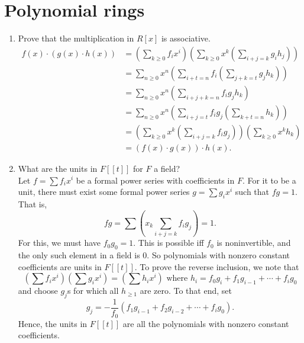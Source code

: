 \documentclass[13pt]{article}
\begin{document}
\section{Polynomial rings}
\begin{enumerate}
\item Prove that the multiplication in $R[x]$ is associative.\\
\begin{align*}
f(x)\cdot(g(x)\cdot h(x)) &= 
             \left(\sum_{k\geq 0}f_ix^i\right)\left(\sum_{k\geq 0}x^k\left(\sum_{i+j=k}g_ih_j\right)\right)\\
          &= \sum_{n\geq 0}x^n\left(\sum_{i+t=n}f_i\left(\sum_{j+k=t}g_jh_k\right)\right)\\
          &= \sum_{n\geq 0}x^n\left(\sum_{i+j+k=n}f_ig_jh_k\right)\\
          &= \sum_{n\geq 0}x^n\left(\sum_{i+j=t}f_ig_j\left(\sum_{k+t=n}h_k\right)\right)\\
          &= \left(\sum_{k\geq 0}x^k\left(\sum_{i+j=k}f_ig_j\right)\right)\left(\sum_{k\geq 0}x^kh_k\right)\\
          &= (f(x)\cdot g(x))\cdot h(x).
\end{align*}
\item What are the units in $F[[t]]$ for $F$ a field?\\
Let $f = \sum f_ix^i$ be a formal power series with coefficients in $F$. For it
to be a unit, there must exist some formal power series $g = \sum g_ix^i$ such
that $fg = 1$. That is, \[fg = \sum (x_k \sum_{i+j=k}f_ig_j) = 1.\] 
For this, we must have $f_0g_0=1$. This is possible iff $f_0$ is noninvertible,
and the only such element in a field is $0$. So polynomials with nonzero
constant coefficients are units in $F[[t]]$. 
To prove the reverse inclusion, we note that 
\[(\sum f_ix^i)(\sum g_i x^i) = (\sum h_ix^i)\text{ where } h_i = f_0g_i+f_1g_{i-1}+\cdots+f_ig_0\] and choose $g_j$s for which all $h_{\geq 1}$
are zero. To that end, set \[g_j = -\frac 1 {f_0}(f_1g_{i-1}+f_2g_{i-2}+\cdots+f_ig_0).\] 
Hence, the units in $F[[t]]$ are all the polynomials with nonzero constant coefficients.
\end{enumerate}
\end{document}
